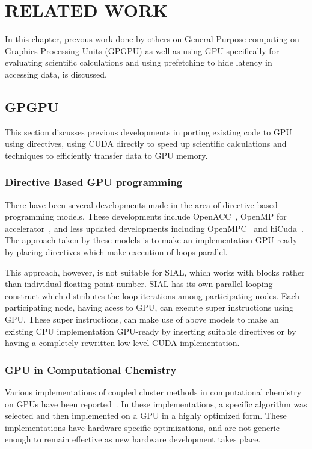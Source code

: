 \chapter{RELATED WORK}\label{lit}
In this chapter, prevous work done by others on General Purpose computing on Graphics Processing
Units (GPGPU) as well as using GPU specifically for evaluating scientific calculations
and using prefetching to hide latency in accessing data, is discussed.

\section{GPGPU}
This section discusses previous developments in porting existing
code to GPU using directives, using CUDA directly to speed up scientific calculations and
techniques to efficiently transfer data to GPU memory.

\subsection{Directive Based GPU programming}
There have been several developments made in the area of directive-based programming models. These
developments include OpenACC~\cite{openacc}, OpenMP for
accelerator~\cite{openmpforaccelerators}, and less updated developments including
OpenMPC~\cite{openmpc} and hiCuda~\cite{hicuda}. The approach taken by these models
is to make an implementation GPU-ready by placing directives which make
execution of loops parallel.

This approach, however, is not suitable for SIAL, which works with blocks rather
than individual floating point number. SIAL has its own parallel looping construct which
distributes the loop iterations among participating nodes. Each participating node,
having acess to GPU, can execute super instructions using GPU. These super instructions,
can make use of above models to make an existing CPU implementation
GPU-ready by inserting suitable directives or by having a completely rewritten low-level
CUDA implementation.

\subsection{GPU in Computational Chemistry}
Various implementations of coupled cluster methods in computational chemistry
on GPUs have been reported~\cite{bhaskar2013}\cite{deprince2011}\cite{maw2011}. In these
implementations, a specific algorithm was selected and then implemented on a
GPU in a highly optimized form. These implementations have hardware specific
optimizations, and are not generic enough to remain effective as new hardware
development takes place.

